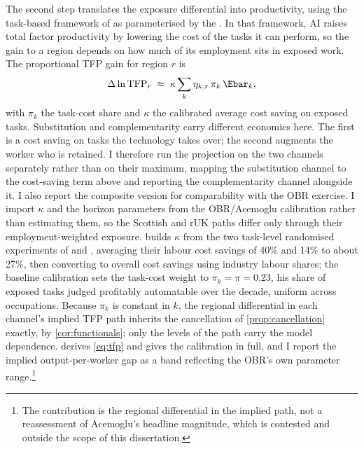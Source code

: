 The second step translates the exposure differential into productivity, using the task-based framework of \citet{acemoglu2025} as parameterised by the \citet{obr2025}. In that framework, AI raises total factor productivity by lowering the cost of the tasks it can perform, so the gain to a region depends on how much of its employment sits in exposed work. The proportional TFP gain for region $r$ is
\begin{equation}\label{eq:tfp}
\Delta \ln \mathrm{TFP}_r \;\approx\;
\kappa \sum_k \eta_{k,r}\, \pi_k\, \Ebar_k ,
\end{equation}
with $\pi_k$ the task-cost share and $\kappa$ the calibrated average cost saving on exposed tasks. Substitution and complementarity carry different economics here. The first is a cost saving on tasks the technology takes over; the second augments the worker who is retained. I therefore run the projection on the two channels separately rather than on their maximum, mapping the substitution channel to the cost-saving term above and reporting the complementarity channel alongside it. I also report the composite version for comparability with the OBR exercise. I import $\kappa$ and the horizon parameters from the OBR/Acemoglu calibration rather than estimating them, so the Scottish and rUK paths differ only through their employment-weighted exposure. \citet{acemoglu2025} builds $\kappa$ from the two task-level randomised experiments of \citet{noy2023} and \citet{brynjolfsson2025}, averaging their labour cost savings of 40\% and 14\% to about 27\%, then converting to overall cost savings using industry labour shares; the baseline calibration sets the task-cost weight to $\pi_k = \pi = 0.23$, his share of exposed tasks judged profitably automatable over the decade, uniform across occupations. Because $\pi_k$ is constant in $k$, the regional differential in each channel's implied TFP path inherits the cancellation of \cref{prop:cancellation} exactly, by \cref{cor:functionals}; only the levels of the path carry the model dependence.  derives \cref{eq:tfp} and gives the calibration in full, and I report the implied output-per-worker gap as a band reflecting the OBR's own parameter range.\footnote{The contribution is the regional differential in the implied path, not a reassessment of Acemoglu's headline magnitude, which is contested and outside the scope of this dissertation.}

